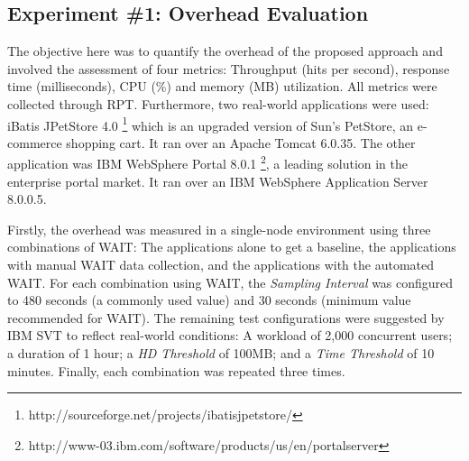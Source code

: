 \documentclass[runningheads,a4paper]{llncs}
\newcommand{\myspaceM}{-7.6pt}
\begin{document}
\vspace{\myspaceM{}}
\subsection{Experiment \#1: Overhead Evaluation}
\vspace{\myspaceM{}}

The objective here was to quantify the overhead of the proposed approach and
involved the assessment of four metrics: Throughput (hits per second), response
time (milliseconds), CPU (\%) and memory (MB) utilization. All metrics were
collected through RPT. Furthermore, two real-world applications were used:
iBatis JPetStore 4.0 \footnote{http://sourceforge.net/projects/ibatisjpetstore/}
which is an upgraded version of Sun's PetStore, an e-commerce shopping cart. It
ran over an Apache Tomcat 6.0.35. The other application was IBM WebSphere Portal 
8.0.1 \footnote{http://www-03.ibm.com/software/products/us/en/portalserver},
a leading solution in the enterprise portal market. It ran over an IBM WebSphere
Application Server 8.0.0.5.


Firstly, the overhead was measured in a single-node environment using three
combinations of WAIT: The applications alone to get a baseline, the applications
with manual WAIT data collection, and the applications with the automated
WAIT. For each combination using WAIT, the \emph{Sampling Interval} was
configured to 480 seconds (a commonly used value) and 30 seconds (minimum value 
recommended for WAIT). The remaining test configurations were suggested by IBM SVT to
reflect real-world conditions: A workload of 2,000 concurrent users; a duration
of 1 hour; a \emph{HD Threshold} of 100MB; and a \emph{Time Threshold} of
10 minutes. Finally, each combination was repeated three times.
\end{document}

